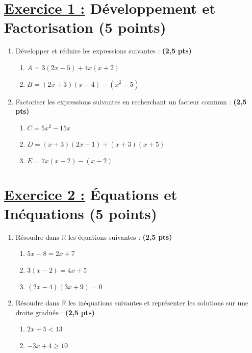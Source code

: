 \documentclass[12pt,a4paper]{article}
\begin{document}
\section*{\underline{Exercice 1 :} Développement et Factorisation (5 points)}
\begin{enumerate}
    \item Développer et réduire les expressions suivantes : \textbf{(2,5 pts)}
    \begin{enumerate}
        \item $A = 3(2x - 5) + 4x(x + 2)$
        \item $B = (2x + 3)(x - 4) - (x^2 - 5)$
    \end{enumerate}
    \item Factoriser les expressions suivantes en recherchant un facteur commun : \textbf{(2,5 pts)}
    \begin{enumerate}
        \item $C = 5x^2 - 15x$
        \item $D = (x + 3)(2x - 1) + (x + 3)(x + 5)$
        \item $E = 7x(x - 2) - (x - 2)$
    \end{enumerate}
\end{enumerate}

\section*{\underline{Exercice 2 :} Équations et Inéquations (5 points)}
\begin{enumerate}
    \item Résoudre dans $\mathbb{R}$ les équations suivantes : \textbf{(2,5 pts)}
    \begin{enumerate}
        \item $5x - 8 = 2x + 7$
        \item $3(x - 2) = 4x + 5$
        \item $(2x - 4)(3x + 9) = 0$
    \end{enumerate}
    \item Résoudre dans $\mathbb{R}$ les inéquations suivantes et représenter les solutions sur une droite graduée : \textbf{(2,5 pts)}
    \begin{enumerate}
        \item $2x + 5 < 13$
        \item $-3x + 4 \geq 10$
    \end{enumerate}
\end{enumerate}
\end{document}
